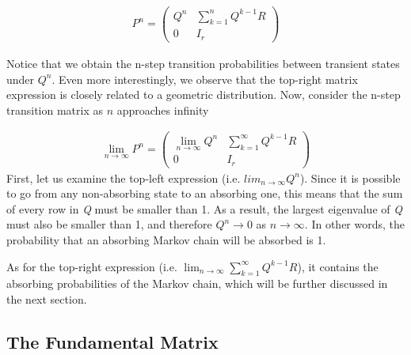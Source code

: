\documentclass[a4paper,12pt]{article}
\theoremstyle{definition}
\begin{document}
	\begin{equation*}
	\begin{aligned}
		P^n = \left(
		\begin{array}{c|c}
		Q^n & \sum_{k=1}^{n}Q^{k-1}R\\
		\hline
		0 & I_r
		\end{array}
		\right)
	\end{aligned}
	\end{equation*}	

	Notice that we obtain the n-step transition probabilities between transient states under $Q^n$. Even more interestingly, we observe that the top-right matrix expression is closely related to a geometric distribution.
Now, consider the n-step transition matrix as $n$ approaches infinity

	\begin{equation*}
	\begin{aligned}
		\lim_{n\to\infty}P^n = \left(
		\begin{array}{c|c}
		\lim_{n\to\infty} Q^n & \sum_{k=1}^{\infty}Q^{k-1}R\\
		\hline
		0 & I_r
		\end{array}
		\right)
	\end{aligned}
	\end{equation*}	
First, let us examine the top-left expression (i.e. $lim_{n\to\infty}Q^n$). Since it is possible to go from any non-absorbing state to an absorbing one, this means that the sum of every row in \emph{Q} must be smaller than 1. As a result, the largest eigenvalue of \emph{Q} must also be smaller than 1, and therefore $Q^n \rightarrow 0$ as $n \rightarrow \infty$. In other words, the probability that an absorbing Markov chain will be absorbed is 1.


As for the top-right expression (i.e. $\lim_{n\to\infty} \sum_{k=1}^{\infty}Q^{k-1}R$), it contains the absorbing probabilities of the Markov chain, which will be further discussed in the next section.

	\subsection*{The Fundamental Matrix}
	
\end{document}
